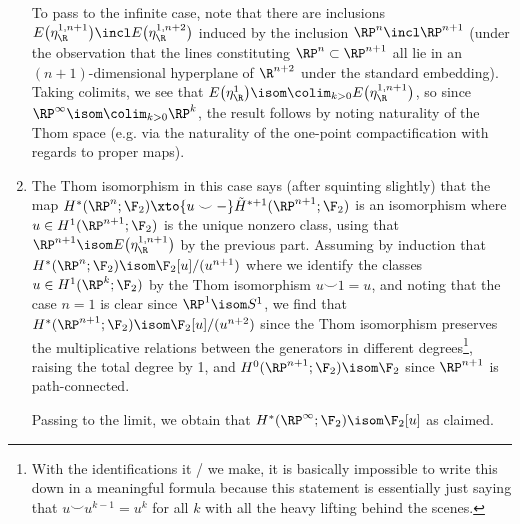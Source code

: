 \begin{solution}
\begin{enumerate}
			To pass to the infinite case, note that there are inclusions $E\big(\eta_\R^{1, n + 1}\big) \incl E\big(\eta_\R^{1, n + 2}\big)$ induced by the inclusion $\RP^n \incl \RP^{n + 1}$ (under the observation that the lines constituting $\RP^n \subset \RP^{n + 1}$ all lie in an $(n + 1)$-dimensional hyperplane of $\R^{n + 2}$ under the standard embedding).
			Taking colimits, we see that $E\big(\eta_\R^1\big) \isom \colim_{k > 0} E\big(\eta_\R^{1, n + 1}\big)$, so since $\RP^\infty \isom \colim_{k > 0} \RP^k$, the result follows by noting naturality of the Thom space (e.g. via the naturality of the one-point compactification with regards to proper maps).
		\item The Thom isomorphism in this case says (after squinting slightly) that the map $H^*(\RP^n; \F_2) \xto{u \smile {{-}}} \tilde{H}^{* + 1}(\RP^{n + 1}; \F_2)$ is an isomorphism where $u \in H^1(\RP^{n + 1}; \F_2)$ is the unique nonzero class, using that $\RP^{n + 1} \isom E\big(\eta_\R^{1, n + 1}\big)$ by the previous part.
			Assuming by induction that $H^*(\RP^n; \F_2) \isom \F_2[u] / (u^{n + 1})$ where we identify the classes $u \in H^1(\RP^k; \F_2)$ by the Thom isomorphism $u \smile 1 = u$, and noting that the case $n = 1$ is clear since $\RP^1 \isom S^1$, we find that $H^*(\RP^{n + 1}; \F_2) \isom \F_2[u] / (u^{n + 2})$ since the Thom isomorphism preserves the multiplicative relations between the generators in different degrees\footnote{With the identifications it / we make, it is basically impossible to write this down in a meaningful formula because this statement is essentially just saying that $u \smile u^{k - 1} = u^k$ for all $k$ with all the heavy lifting behind the scenes.}, raising the total degree by 1, and $H^0(\RP^{n + 1}; \F_2) \isom \F_2$ since $\RP^{n + 1}$ is path-connected.

			Passing to the limit, we obtain that $H^*(\RP^\infty; \F_2) \isom \F_2[u]$ as claimed.
			\qedhere
	\end{enumerate}
\end{solution}

